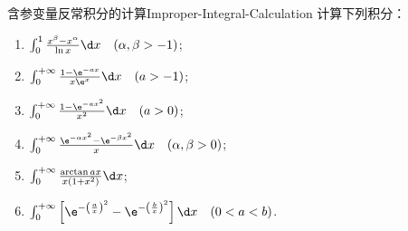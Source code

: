 \begin{problem}{含参变量反常积分的计算}{Improper-Integral-Calculation}
    计算下列积分：
    \begin{enumerate}
        \item $\int_0^1 \frac{x^\beta - x^\alpha}{\ln x} \d x \quad (\alpha, \beta > -1)$;
        \item $\int_0^{+\infty} \frac{1 - \e^{-ax}}{x\e^x} \d x \quad (a > -1)$;
        \item $\int_0^{+\infty} \frac{1 - \e^{-ax^2}}{x^2} \d x \quad (a > 0)$;
        \item $\int_0^{+\infty} \frac{\e^{-\alpha x^2} - \e^{-\beta x^2}}{x} \d x \quad (\alpha, \beta > 0)$;
        \item $\int_0^{+\infty} \frac{\arctan ax}{x(1 + x^2)} \d x$;
        \item $\int_0^{+\infty} \left[ \e^{-\left(\frac{a}{x}\right)^2} - \e^{-\left(\frac{b}{x}\right)^2} \right] \d x \quad (0 < a < b)$.
    \end{enumerate}
\end{problem}

